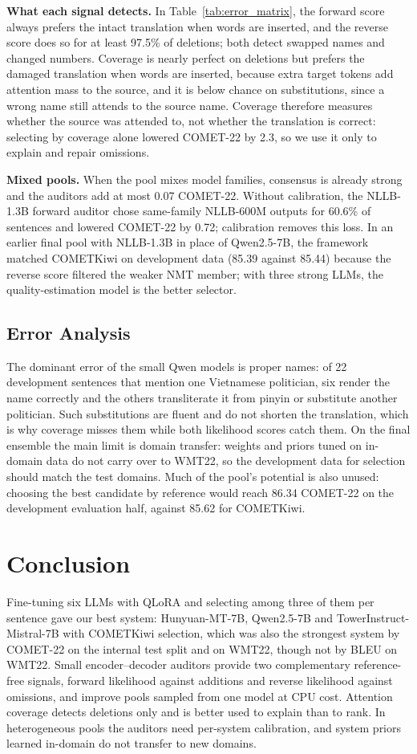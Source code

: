 \documentclass[11pt]{article}
\begin{document}
\textbf{What each signal detects.} In Table~\ref{tab:error_matrix}, the forward score always prefers the intact translation when words are inserted, and the reverse score does so for at least 97.5\% of deletions; both detect swapped names and changed numbers. Coverage is nearly perfect on deletions but prefers the damaged translation when words are inserted, because extra target tokens add attention mass to the source, and it is below chance on substitutions, since a wrong name still attends to the source name. Coverage therefore measures whether the source was attended to, not whether the translation is correct: selecting by coverage alone lowered COMET-22 by 2.3, so we use it only to explain and repair omissions.

\textbf{Mixed pools.} When the pool mixes model families, consensus is already strong and the auditors add at most 0.07 COMET-22. Without calibration, the NLLB-1.3B forward auditor chose same-family NLLB-600M outputs for 60.6\% of sentences and lowered COMET-22 by 0.72; calibration removes this loss. In an earlier final pool with NLLB-1.3B in place of Qwen2.5-7B, the framework matched COMETKiwi on development data (85.39 against 85.44) because the reverse score filtered the weaker NMT member; with three strong LLMs, the quality-estimation model is the better selector.

\subsection{Error Analysis}
\label{subsec:error_analysis}
The dominant error of the small Qwen models is proper names: of 22 development sentences that mention one Vietnamese politician, six render the name correctly and the others transliterate it from pinyin or substitute another politician. Such substitutions are fluent and do not shorten the translation, which is why coverage misses them while both likelihood scores catch them. On the final ensemble the main limit is domain transfer: weights and priors tuned on in-domain data do not carry over to WMT22, so the development data for selection should match the test domains. Much of the pool's potential is also unused: choosing the best candidate by reference would reach 86.34 COMET-22 on the development evaluation half, against 85.62 for COMETKiwi.

\section{Conclusion}
\label{sec:conclusion}
Fine-tuning six LLMs with QLoRA and selecting among three of them per sentence gave our best system: Hunyuan-MT-7B, Qwen2.5-7B and TowerInstruct-Mistral-7B with COMETKiwi selection, which was also the strongest system by COMET-22 on the internal test split and on WMT22, though not by BLEU on WMT22. Small encoder--decoder auditors provide two complementary reference-free signals, forward likelihood against additions and reverse likelihood against omissions, and improve pools sampled from one model at CPU cost. Attention coverage detects deletions only and is better used to explain than to rank. In heterogeneous pools the auditors need per-system calibration, and system priors learned in-domain do not transfer to new domains.
\end{document}
